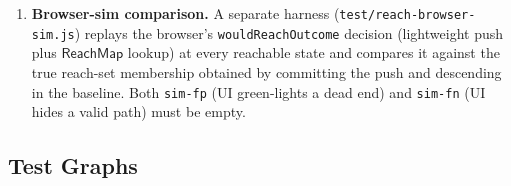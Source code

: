 \documentclass[11pt]{article}
\theoremstyle{definition}
\newcommand{\ik}{\mathsf{irrKey}}      %
\begin{document}
\begin{enumerate}
    collapse to the same $\ik$, the stored mask is their OR, which would
    appear correct to an aggregated check but violates the browser's
    per-state query.
  \item \textbf{Browser-sim comparison.} A separate harness
    (\texttt{test/reach-browser-sim.js}) replays the browser's
    \texttt{wouldReachOutcome} decision (lightweight push plus
    $\mathsf{ReachMap}$ lookup) at every reachable state and compares it
    against the true reach-set membership obtained by committing the push
    and descending in the baseline. Both \texttt{sim-fp} (UI green-lights
    a dead end) and \texttt{sim-fn} (UI hides a valid path) must be
    empty.
\end{enumerate}

\subsection{Test Graphs}
\end{document}
